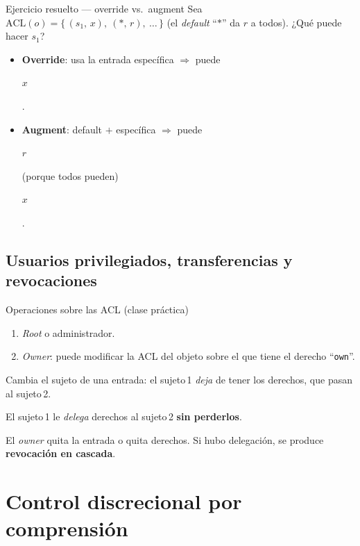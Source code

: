 \documentclass[11pt,a4paper]{article}
\newcommand{\highlight}[2]{\colorbox{#1}{\strut #2}}
\begin{document}
\begin{practbox}{Ejercicio resuelto — override vs.\ augment}
Sea $\mathrm{ACL}(o) = \{\, (s_1,\,x),\ (\ast,\,r),\ \dots \,\}$ (el \emph{default} ``$\ast$''
da $r$ a todos). ¿Qué puede hacer $s_1$?
\begin{itemize}[leftmargin=1.4em,itemsep=1pt]
  \item \textbf{Override}: usa la entrada específica $\Rightarrow$ puede \highlight{slideGray}{$x$}.
  \item \textbf{Augment}: default $+$ específica $\Rightarrow$ puede
        \highlight{slideGray}{$r$} (porque todos pueden) \highlight{slideGray}{$x$}.
\end{itemize}
\end{practbox}

\subsection{Usuarios privilegiados, transferencias y revocaciones}
\begin{practbox}{Operaciones sobre las ACL (clase práctica)}
\begin{description}[leftmargin=2.2em,style=nextline,itemsep=3pt,font=\bfseries]
  \item[Usuarios privilegiados]
    \begin{enumerate}[leftmargin=1.2em,itemsep=0pt]
      \item \emph{Root} o administrador.
      \item \emph{Owner}: puede modificar la ACL del objeto sobre el que tiene el derecho
            ``\texttt{own}''.
    \end{enumerate}
  \item[Transferencia] Cambia el sujeto de una entrada: el sujeto\,1 \emph{deja} de tener los
        derechos, que pasan al sujeto\,2.
  \item[Delegación] El sujeto\,1 le \emph{delega} derechos al sujeto\,2 \textbf{sin perderlos}.
  \item[Revocación] El \emph{owner} quita la entrada o quita derechos. Si hubo delegación,
        se produce \textbf{revocación en cascada}.
\end{description}
\end{practbox}

\section{Control discrecional por comprensión}
\end{document}
